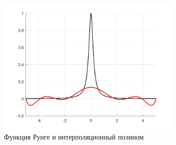 \begin{figure}[h]
  \caption{Функция Рунге и интерполяционный полином}
  \label{fig:plot_6}
  \centering
  \includegraphics[width=0.8\textwidth]{images/task_6_1.png}
\end{figure}
